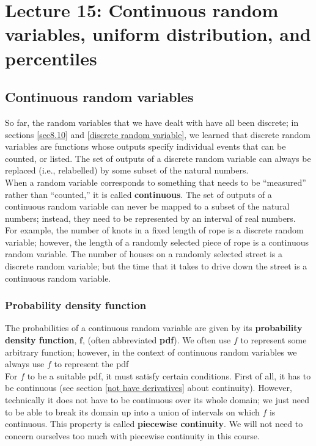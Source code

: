 \chapter{Lecture 15: Continuous random variables, uniform distribution, and percentiles}
\section{Continuous random variables}
So far, the random variables that we have dealt with have all been discrete; in sections \ref{sec8.10} and \ref{discrete random variable}, we learned that discrete random variables are functions whose outputs specify individual events that can be counted, or listed. The set of outputs of a discrete random variable can always be replaced (i.e., relabelled) by some subset of the natural numbers. \\

\noindent When a random variable corresponds to something that needs to be ``measured'' rather than ``counted,'' it is called \textbf{continuous}. The set of outputs of a continuous random variable can never be mapped to a subset of the natural numbers; instead, they need to be represented by an interval of real numbers. \\

\noindent For example, the number of knots in a fixed length of rope is a discrete random variable; however, the length of a randomly selected piece of rope is a continuous random variable. The number of houses on a randomly selected street is a discrete random variable; but the time that it takes to drive down the street is a continuous random variable.

\subsection{Probability density function} \label{pdf}
The probabilities of a continuous random variable are given by its \textbf{probability density function}, $\boldsymbol{f}$, (often abbreviated \textbf{pdf}). We often use $f$ to represent some arbitrary function; however, in the context of continuous random variables we always use $f$ to represent the pdf \label{f(pdf)}\\

\noindent For $f$ to be a suitable pdf, it must satisfy certain conditions. First of all, it has to be continuous (see section \ref{not have derivatives} about continuity). However, technically it does not have to be continuous over its whole domain; we just need to be able to break its domain up into a union of intervals on which $f$ is continuous. This property is called \textbf{piecewise continuity}. We will not need to concern ourselves too much with piecewise continuity in this course. \\

